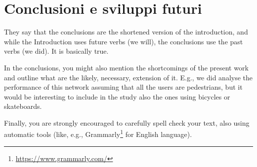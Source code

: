 
\chapter{Conclusioni e sviluppi futuri}
\label{ch:conclusioni}

They say that the conclusions are the shortened version of the introduction, and while the Introduction uses future verbs (we will), the conclusions use the past verbs (we did). It is basically true.

In the conclusions, you might also mention the shortcomings of the present work and outline what are the likely, necessary, extension of it.
E.g., we did analyse the performance of this network assuming that all the users are pedestrians, but it would be interesting to include in the study also the ones using bicycles or skateboards.

Finally, you are strongly encouraged to carefully spell check your text, also using automatic tools (like, e.g., Grammarly\footnote{\url{https://www.grammarly.com/}} for English language).